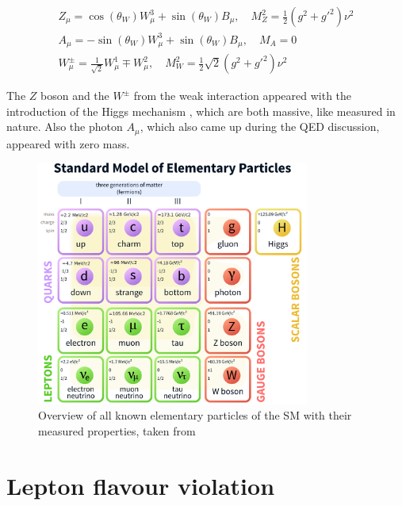 \begin{equation}
	\label{eq:eq_1_10}
	\begin{split}
		Z_{\mu} = \cos(\theta_{W})W^{3}_{\mu} + \sin(\theta_{W})B_{\mu}, \quad M_{Z}^2 = \frac{1}{2}(g^2 + g'^2)\nu^2 \\
		A_{\mu} = -\sin(\theta_{W})W^{3}_{\mu} + \sin(\theta_{W})B_{\mu}, \quad M_{A} = 0 \\
		W^{\pm}_{\mu} = \frac{1}{\sqrt{2}}W^{1}_{\mu} \mp W^{2}_{\mu}, \quad M_{W}^2 = \frac{1}2{\sqrt{2}}(g^2+g'^2)\nu^2
	\end{split}
\end{equation}

The $Z$ boson and the $W^{\pm}$ from the weak interaction appeared with the introduction of the Higgs mechanism \cite{HIGGDISCOVER}, which are both massive, like measured in nature. Also the photon $A_{\mu}$, which also came up during the \gls{QED} discussion, appeared with zero mass. 


\begin{figure}[hpt]
	\centering
	\includegraphics[width=0.8\textwidth]{pictures/Standard_Model_of_Elementary_Particles.pdf}

	\caption[Overview of Standard Model particles]{Overview of all known elementary particles of the \gls{SM} with their measured properties, taken from \cite{SMPARTICLES}}
	\label{fig:fig_1_1}
\end{figure}


\section{Lepton flavour violation}
\label{sec:section_1_3}

